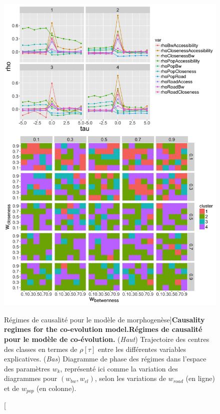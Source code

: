 \begin{figure}
	\includegraphics[width=\linewidth,height=0.93\textheight]{Figures/Final/7-2-2-fig-mesocoevolmodel-causality}
	\caption[Causality regimes][Régimes de causalité pour le modèle de morphogenèse]{\textbf{Causality regimes for the co-evolution model.}\label{fig:mesocoevolmodel:causality}}{\textbf{Régimes de causalité pour le modèle de co-évolution.} (\textit{Haut}) Trajectoire des centres des classes en termes de $\rho[\tau]$ entre les différentes variables explicatives. (\textit{Bas}) Diagramme de phase des régimes dans l'espace des paramètres $w_k$, représenté ici comme la variation des diagrammes pour $(w_{bw},w_{cl})$, selon les variations de $w_{road}$ (en ligne) et de $w_{pop}$ (en colonne). \label{fig:mesocoevolmodel:causality}}
\end{figure}





